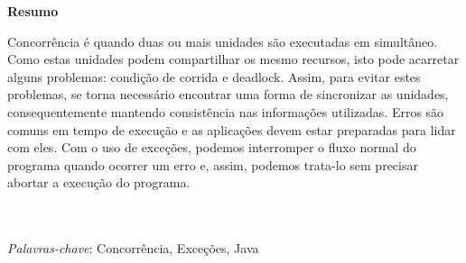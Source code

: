 {
\Large
\begin{center}
\textbf{Resumo}
\end{center}
}

Concorrência é quando duas ou mais unidades são executadas em simultâneo. Como estas unidades
podem compartilhar os mesmo recursos, isto pode acarretar alguns problemas: condição de
corrida e deadlock. Assim, para evitar estes problemas, se torna necessário encontrar uma forma
de sincronizar as unidades, consequentemente mantendo consistência nas informações utilizadas.
Erros são comuns em tempo de execução e as aplicações devem estar preparadas para lidar com eles.
Com o uso de exceções, podemos interromper o fluxo normal do programa quando ocorrer um erro e, assim,
podemos trata-lo sem precisar abortar a execução do programa.

\quad\\
\quad\\
\textit{Palavras-chave}: Concorrência, Exceções, Java

\pagebreak
